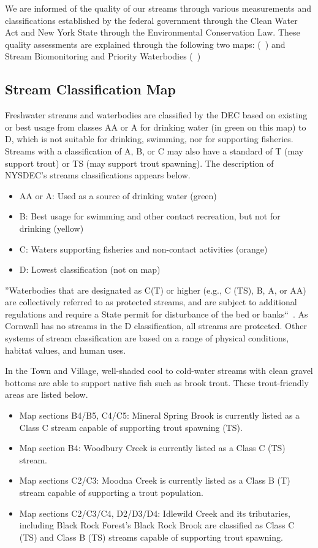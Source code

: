 We are informed of the quality of our streams through various measurements and 
classifications established by the federal government through the Clean Water 
Act and New York State through the Environmental Conservation Law. These 
quality assessments are explained through the following two maps: 
(~) and Stream Biomonitoring and 
Priority Waterbodies (~)

\subsection*{Stream Classification Map}
Freshwater streams and waterbodies are classified by the DEC based on existing 
or best usage from classes AA or A for drinking water (in green on this map) to 
D, which is not suitable for drinking, swimming, nor for supporting fisheries. 
Streams with a classification of A, B, or C may also have a standard of T (may 
support trout) or TS (may support trout spawning). The description of NYSDEC’s 
streams classifications appears below.
\begin{itemize}
    \item AA or A: Used as a source of drinking water (green)
    \item B: Best usage for swimming and other contact recreation, but not for
        drinking (yellow)
    \item C: Waters supporting fisheries and non-contact activities (orange)
    \item D: Lowest classification (not on map)
\end{itemize}
''Waterbodies that are designated as C(T) or higher (e.g., C (TS), B, A, or AA) 
are collectively referred to as protected streams, and are subject to 
additional regulations and require a State permit for disturbance of the bed or 
banks``~\citep{haeckel2014}. As Cornwall has no streams in the D 
classification, all streams are protected. Other systems of stream 
classification are based on a range of physical conditions, habitat values, and 
human uses.

In the Town and Village, well-shaded cool to cold-water streams with clean 
gravel bottoms are able to support native fish such as brook trout. These 
trout-friendly areas are listed below.
\begin{itemize}
    \item Map sections B4/B5, C4/C5: Mineral Spring Brook is currently listed 
as a Class C stream capable of supporting trout spawning (TS).
    \item Map section B4: Woodbury Creek is currently listed as a Class C (TS) 
stream.
    \item Map sections C2/C3: Moodna Creek is currently listed as a Class B (T) 
stream capable of supporting a trout population.
    \item Map sections C2/C3/C4, D2/D3/D4: Idlewild Creek and its tributaries, 
including Black Rock Forest’s Black Rock Brook are classified as Class C (TS) 
and Class B (TS) streams capable of supporting trout spawning.
\end{itemize}

